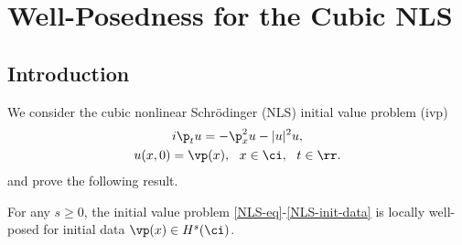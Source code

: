 \chapter{Well-Posedness for the Cubic NLS }
				  \section{Introduction}
				  We consider the cubic nonlinear Schr\"{o}dinger (NLS) 
				  initial value problem (ivp)
%
%
\begin{gather}
	\label{NLS-eq}
		i \p_t u = - \p_x^2 u - |u|^{2} u,
		\\
		\label{NLS-init-data}
		u(x,0) = \vp(x), \ \ x \in \ci, \ \ t \in \rr.
\end{gather}
%
%
and prove the following result.
%
%
%
%
%
%
%
%
%
%
\begin{theorem}
	\label{thm:main}
	For any $s \ge 0$, the initial value problem 
	\eqref{NLS-eq}-\eqref{NLS-init-data} is locally well-posed for 
	initial data $\vp(x) \in H^s(\ci)$.
%
%
\end{theorem} 
%
%
%
%
%
%
%
%
%
%
